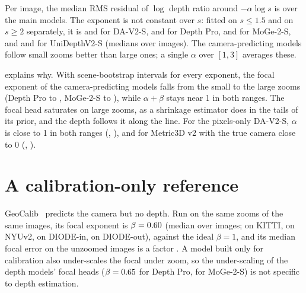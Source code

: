 \documentclass[10pt,twocolumn,letterpaper]{article}
\begin{document}
Per image, the median RMS residual of $\log$ depth ratio around $-\alpha\log s$ is \fitRmsMedian{} over the main
models. The exponent is not constant over $s$: fitted on $s\le1.5$ and on $s\ge2$ separately, it is
\DavTwoSAlphaSmall{} and \DavTwoSAlphaLarge{} for DA-V2-S, \DepthproAlphaSmall{} and \DepthproAlphaLarge{} for
Depth Pro, \MogeTwoSAlphaSmall{} and \MogeTwoSAlphaLarge{} for MoGe-2-S, and \UnidepthTwoSAlphaSmall{} and
\UnidepthTwoSAlphaLarge{} for UniDepthV2-S (medians over images). The camera-predicting models follow small zooms
better than large ones; a single $\alpha$ over $[1,3]$ averages these.

 explains why. With scene-bootstrap intervals for every exponent, the focal exponent of the
camera-predicting models falls from the small to the large zooms (Depth Pro \DepthproUncBetaSmall{} to
\DepthproUncBetaLarge, MoGe-2-S \MogeTwoSUncBetaSmall{} to \MogeTwoSUncBetaLarge), while $\alpha+\beta$ stays near 1
in both ranges. The focal head saturates on large zooms, as a shrinkage estimator does in the tails of its prior,
and the depth follows it along the line. For the pixels-only DA-V2-S, $\alpha$ is close to 1 in both ranges
(\DavTwoSUncAlphaSmall, \DavTwoSUncAlphaLarge), and for Metric3D v2 with the true camera close to 0
(\MetricThreedSUncAlphaSmall, \MetricThreedSUncAlphaLarge).



\section{A calibration-only reference}\label{sec:supp_geocalib}

GeoCalib~\cite{veicht2024geocalib} predicts the camera but no depth. Run on the same zooms of the same
\geocalibImages{} images, its focal exponent is $\beta=0.60$ (median over images; \GeocalibKittiBeta{} on
KITTI, \GeocalibNyuBeta{} on NYUv2, \GeocalibDiodeInBeta{} on DIODE-in, \GeocalibDiodeOutBeta{} on DIODE-out),
against the ideal $\beta=1$, and its median focal error on the unzoomed images is a factor \geocalibFocalErr. A model
built only for calibration also under-scales the focal under zoom, so the under-scaling of the depth models' focal
heads ($\beta=0.65$ for Depth Pro, \MogeTwoSBeta{} for MoGe-2-S) is not specific to depth estimation.
\end{document}
